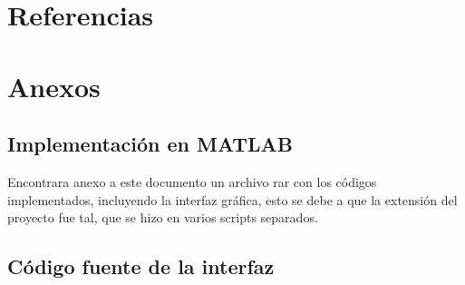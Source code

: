 \documentclass[11pt, letterpaper]{article}
\begin{document}
\newpage

	
\section{Referencias}  %

\newpage
	
\section{Anexos}	

\subsection{Implementación  en MATLAB}
	
Encontrara anexo a este documento un archivo rar con los códigos implementados, incluyendo la interfaz gráfica, esto se debe a que la extensión del proyecto fue tal, que se hizo en varios scripts separados.	

\newpage

\subsection{Código fuente de la interfaz}
\end{document}
